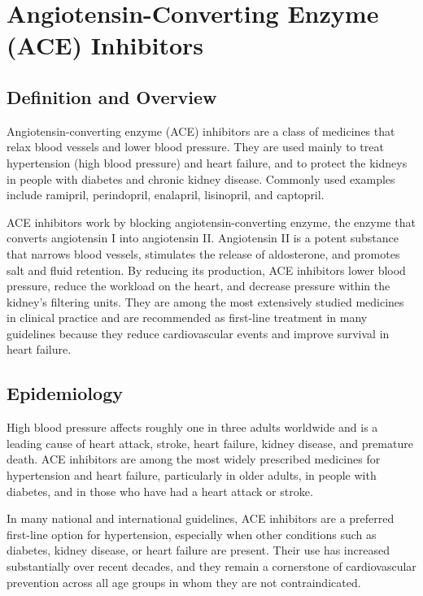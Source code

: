 \chapter{Angiotensin-Converting Enzyme (ACE) Inhibitors}

\section*{Definition and Overview}
Angiotensin-converting enzyme (ACE) inhibitors are a class of medicines that relax blood vessels and lower blood pressure. They are used mainly to treat hypertension (high blood pressure) and heart failure, and to protect the kidneys in people with diabetes and chronic kidney disease. Commonly used examples include ramipril, perindopril, enalapril, lisinopril, and captopril.

ACE inhibitors work by blocking angiotensin-converting enzyme, the enzyme that converts angiotensin I into angiotensin II. Angiotensin II is a potent substance that narrows blood vessels, stimulates the release of aldosterone, and promotes salt and fluid retention. By reducing its production, ACE inhibitors lower blood pressure, reduce the workload on the heart, and decrease pressure within the kidney's filtering units. They are among the most extensively studied medicines in clinical practice and are recommended as first-line treatment in many guidelines because they reduce cardiovascular events and improve survival in heart failure.

\section*{Epidemiology}
High blood pressure affects roughly one in three adults worldwide and is a leading cause of heart attack, stroke, heart failure, kidney disease, and premature death. ACE inhibitors are among the most widely prescribed medicines for hypertension and heart failure, particularly in older adults, in people with diabetes, and in those who have had a heart attack or stroke.

In many national and international guidelines, ACE inhibitors are a preferred first-line option for hypertension, especially when other conditions such as diabetes, kidney disease, or heart failure are present. Their use has increased substantially over recent decades, and they remain a cornerstone of cardiovascular prevention across all age groups in whom they are not contraindicated.

